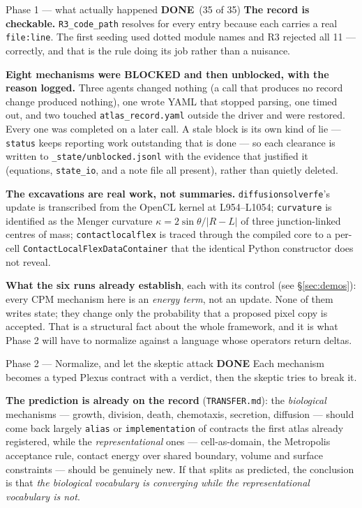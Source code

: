 \documentclass[11pt,a4paper]{article}
\newcommand{\code}[1]{\texttt{#1}}
\newcommand{\done}{\textcolor{good}{\textbf{DONE}}}
\begin{document}
\begin{phasebox}{Phase 1 --- what actually happened \hfill \done\ (35 of 35)}
\textbf{The record is checkable.} \code{R3\_code\_path} resolves for every entry because each
carries a real \code{file:line}. The first seeding used dotted module names and R3 rejected all 11
--- correctly, and that is the rule doing its job rather than a nuisance.

\textbf{Eight mechanisms were BLOCKED and then unblocked, with the reason logged.} Three agents
changed nothing (a call that produces no record change produced nothing), one wrote YAML that
stopped parsing, one timed out, and two touched \code{atlas\_record.yaml} outside the driver and
were restored. Every one was completed on a later call. A stale block is its own kind of lie ---
\code{status} keeps reporting work outstanding that is done --- so each clearance is written to
\code{\_state/unblocked.jsonl} with the evidence that justified it (equations, \code{state\_io},
and a note file all present), rather than quietly deleted.

\textbf{The excavations are real work, not summaries.} \code{diffusionsolverfe}'s update is
transcribed from the OpenCL kernel at L954--L1054; \code{curvature} is identified as the Menger
curvature $\kappa = 2\sin\theta/|R-L|$ of three junction-linked centres of mass;
\code{contactlocalflex} is traced through the compiled core to a per-cell
\code{ContactLocalFlexDataContainer} that the identical Python constructor does not reveal.

\textbf{What the six runs already establish}, each with its control (see \S\ref{sec:demos}): every
CPM mechanism here is an \emph{energy term}, not an update. None of them writes state; they change
only the probability that a proposed pixel copy is accepted. That is a structural fact about the
whole framework, and it is what Phase 2 will have to normalize against a language whose operators
return deltas.
\end{phasebox}

\begin{phasebox}{Phase 2 --- Normalize, and let the skeptic attack \hfill \done}
Each mechanism becomes a typed Plexus contract with a verdict, then the skeptic tries to break it.

\textbf{The prediction is already on the record} (\code{TRANSFER.md}): the \emph{biological}
mechanisms --- growth, division, death, chemotaxis, secretion, diffusion --- should come back
largely \code{alias} or \code{implementation} of contracts the first atlas already registered,
while the \emph{representational} ones --- cell-as-domain, the Metropolis acceptance rule, contact
energy over shared boundary, volume and surface constraints --- should be genuinely new. If that
splits as predicted, the conclusion is that \emph{the biological vocabulary is converging while
the representational vocabulary is not}.
\end{phasebox}
\end{document}
